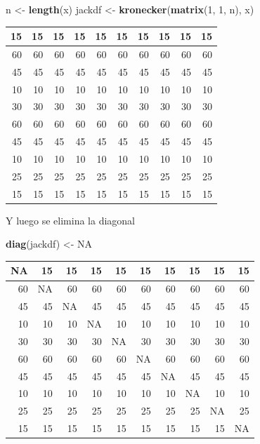 \documentclass[
  12pt,
]{book}
\newenvironment{Shaded}{\begin{snugshade}}{\end{snugshade}}
\newcommand{\DecValTok}[1]{\textcolor[rgb]{0.00,0.00,0.81}{#1}}
\newcommand{\KeywordTok}[1]{\textcolor[rgb]{0.13,0.29,0.53}{\textbf{#1}}}
\newcommand{\NormalTok}[1]{#1}
\newcommand{\OtherTok}[1]{\textcolor[rgb]{0.56,0.35,0.01}{#1}}
\newcommand{\StringTok}[1]{\textcolor[rgb]{0.31,0.60,0.02}{#1}}
\theoremstyle{definition}
\theoremstyle{definition}
\theoremstyle{definition}
\theoremstyle{remark}
\begin{document}
\begin{Shaded}
\begin{Highlighting}[]
\NormalTok{n <-}\StringTok{ }\KeywordTok{length}\NormalTok{(x)}
\NormalTok{jackdf <-}\StringTok{ }\KeywordTok{kronecker}\NormalTok{(}\KeywordTok{matrix}\NormalTok{(}\DecValTok{1}\NormalTok{, }\DecValTok{1}\NormalTok{, n), x)}
\end{Highlighting}
\end{Shaded}

\begin{tabular}{r|r|r|r|r|r|r|r|r|r}
\hline
15 & 15 & 15 & 15 & 15 & 15 & 15 & 15 & 15 & 15\\
\hline
60 & 60 & 60 & 60 & 60 & 60 & 60 & 60 & 60 & 60\\
\hline
45 & 45 & 45 & 45 & 45 & 45 & 45 & 45 & 45 & 45\\
\hline
10 & 10 & 10 & 10 & 10 & 10 & 10 & 10 & 10 & 10\\
\hline
30 & 30 & 30 & 30 & 30 & 30 & 30 & 30 & 30 & 30\\
\hline
60 & 60 & 60 & 60 & 60 & 60 & 60 & 60 & 60 & 60\\
\hline
45 & 45 & 45 & 45 & 45 & 45 & 45 & 45 & 45 & 45\\
\hline
10 & 10 & 10 & 10 & 10 & 10 & 10 & 10 & 10 & 10\\
\hline
25 & 25 & 25 & 25 & 25 & 25 & 25 & 25 & 25 & 25\\
\hline
15 & 15 & 15 & 15 & 15 & 15 & 15 & 15 & 15 & 15\\
\hline
\end{tabular}

Y luego se elimina la diagonal

\begin{Shaded}
\begin{Highlighting}[]
\KeywordTok{diag}\NormalTok{(jackdf) <-}\StringTok{ }\OtherTok{NA}
\end{Highlighting}
\end{Shaded}

\begin{tabular}{r|r|r|r|r|r|r|r|r|r}
\hline
NA & 15 & 15 & 15 & 15 & 15 & 15 & 15 & 15 & 15\\
\hline
60 & NA & 60 & 60 & 60 & 60 & 60 & 60 & 60 & 60\\
\hline
45 & 45 & NA & 45 & 45 & 45 & 45 & 45 & 45 & 45\\
\hline
10 & 10 & 10 & NA & 10 & 10 & 10 & 10 & 10 & 10\\
\hline
30 & 30 & 30 & 30 & NA & 30 & 30 & 30 & 30 & 30\\
\hline
60 & 60 & 60 & 60 & 60 & NA & 60 & 60 & 60 & 60\\
\hline
45 & 45 & 45 & 45 & 45 & 45 & NA & 45 & 45 & 45\\
\hline
10 & 10 & 10 & 10 & 10 & 10 & 10 & NA & 10 & 10\\
\hline
25 & 25 & 25 & 25 & 25 & 25 & 25 & 25 & NA & 25\\
\hline
15 & 15 & 15 & 15 & 15 & 15 & 15 & 15 & 15 & NA\\
\hline
\end{tabular}
\end{document}
